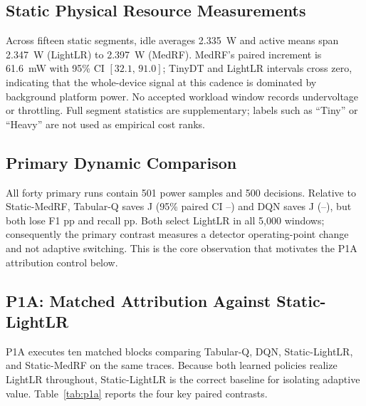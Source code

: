 \subsection{Static Physical Resource Measurements}
Across fifteen static segments, idle averages 2.335~W and active means span 2.347~W (LightLR) to 2.397~W (MedRF). MedRF's paired increment is 61.6~mW with 95\% CI $[32.1,\,91.0]$; TinyDT and LightLR intervals cross zero, indicating that the whole-device signal at this cadence is dominated by background platform power. No accepted workload window records undervoltage or throttling. Full segment statistics are supplementary; labels such as ``Tiny'' or ``Heavy'' are not used as empirical cost ranks.

\subsection{Primary Dynamic Comparison}
All forty primary runs contain 501 power samples and 500 decisions. Relative to Static-MedRF, Tabular-Q saves \TQSavingJ{} J (95\% paired CI \TQSavingJLow{}--\TQSavingJHigh{}) and DQN saves \DQSavingJ{} J (\DQSavingJLow{}--\DQSavingJHigh{}), but both lose \TQFOneDropPP{} F1 pp and \TQRecallDropPP{} recall pp. Both select LightLR in all 5{,}000 windows; consequently the primary contrast measures a detector operating-point change and not adaptive switching. This is the core observation that motivates the P1A attribution control below.

\subsection{P1A: Matched Attribution Against Static-LightLR}
P1A executes ten matched blocks comparing Tabular-Q, DQN, Static-LightLR, and Static-MedRF on the same traces. Because both learned policies realize LightLR throughout, Static-LightLR is the correct baseline for isolating adaptive value. Table~\ref{tab:p1a} reports the four key paired contrasts.

